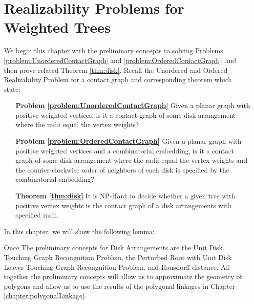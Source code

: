 \chapter{Realizability Problems for Weighted Trees}\label{chp:disk}

We begin this chapter with the preliminary concepts to solving Problems \ref{problem:UnorderedContactGraph} and \ref{problem:OrderedContactGraph}, and then prove related Theorem \ref{thm:disk}.  
Recall the Unordered and Ordered Realizability Problem for a contact graph  and corresponding theorem which state:

\begin{itemize}
\item[\textbf{Problem \ref{problem:UnorderedContactGraph}}] Given a planar graph with positive weighted vertices, is it a contact graph of some disk arrangement where the radii equal the vertex weights?
\item[\textbf{Problem \ref{problem:OrderedContactGraph}}] Given a planar graph with positive weighted vertices and a combinatorial embedding, is it a contact graph of some disk arrangement where the radii equal the vertex weights and the counter-clockwise order of neighbors of each disk is specified by the combinatorial embedding?
\item[\textbf{Theorem \ref{thm:disk}}] It is NP-Hard to decide whether a given tree with positive vertex weights
is the contact graph of a disk arrangements with specified radii.
\end{itemize}

In this chapter, we will show the following lemma:
  
Once
The preliminary concepts for Disk Arrangements are the Unit Disk Touching Graph Recongnition Problem, the Perturbed Root with Unit Disk Leaves Touching Graph Recongnition Problem, and Hausdorff distance.  
All together the proliminary concepts will allow us to approximate the geometry of polygons and allow us to use the results of the polygonal linkages in Chapter \ref{chapter:polygonalLinkage}.
